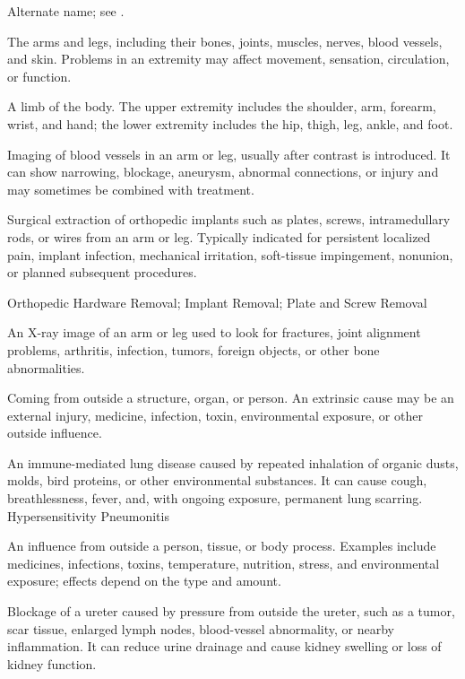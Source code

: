  Alternate name; see .

 The arms and legs, including their bones, joints, muscles, nerves, blood vessels, and skin. Problems in an extremity may affect movement, sensation, circulation, or function.

 A limb of the body. The upper extremity includes the shoulder, arm, forearm, wrist, and hand; the lower extremity includes the hip, thigh, leg, ankle, and foot.

 Imaging of blood vessels in an arm or leg, usually after contrast is introduced. It can show narrowing, blockage, aneurysm, abnormal connections, or injury and may sometimes be combined with treatment.

 Surgical extraction of orthopedic implants such as plates, screws, intramedullary rods, or wires from an arm or leg. Typically indicated for persistent localized pain, implant infection, mechanical irritation, soft-tissue impingement, nonunion, or planned subsequent procedures.

\synonyms
Orthopedic Hardware Removal; Implant Removal; Plate and Screw Removal

 An X-ray image of an arm or leg used to look for fractures, joint alignment problems, arthritis, infection, tumors, foreign objects, or other bone abnormalities.

 Coming from outside a structure, organ, or person. An extrinsic cause may be an external injury, medicine, infection, toxin, environmental exposure, or other outside influence.

 An immune-mediated lung disease caused by repeated inhalation of organic dusts, molds, bird proteins, or other environmental substances. It can cause cough, breathlessness, fever, and, with ongoing exposure, permanent lung scarring.
\synonyms
Hypersensitivity Pneumonitis

 An influence from outside a person, tissue, or body process. Examples include medicines, infections, toxins, temperature, nutrition, stress, and environmental exposure; effects depend on the type and amount.

 Blockage of a ureter caused by pressure from outside the ureter, such as a tumor, scar tissue, enlarged lymph nodes, blood-vessel abnormality, or nearby inflammation. It can reduce urine drainage and cause kidney swelling or loss of kidney function.

